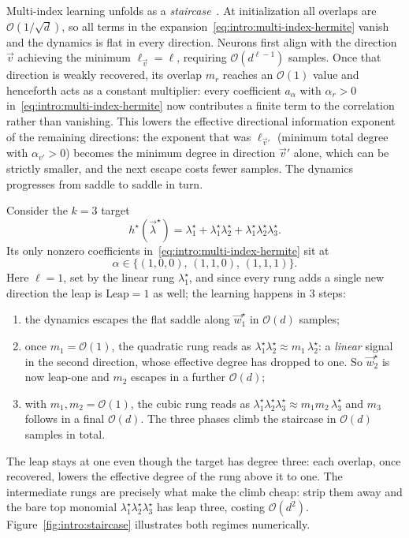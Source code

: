 Multi-index learning unfolds as a \emph{staircase}~\citep{abbe2022merged, abbe2023sgd, dandi2023how}. At initialization all overlaps are \(\mathcal{O}(1/\sqrt{d})\), so all terms in the expansion~\eqref{eq:intro:multi-index-hermite} vanish and the dynamics is flat in every direction. Neurons first align with the direction \(\vec{v}\) achieving the minimum \(\ell_{\vec{v}} = \ell\), requiring \(\mathcal{O}(d^{\ell-1})\) samples. Once that direction is weakly recovered, its overlap \(m_r\) reaches an \(\mathcal{O}(1)\) value and henceforth acts as a constant multiplier: every coefficient \(a_\alpha\) with \(\alpha_r > 0\) in~\eqref{eq:intro:multi-index-hermite} now contributes a finite term to the correlation rather than vanishing. This lowers the effective directional information exponent of the remaining directions: the exponent that was \(\ell_{\vec{v}'}\) (minimum total degree with \(\alpha_{v'} > 0\)) becomes the minimum degree in direction \(\vec{v}'\) alone, which can be strictly smaller, and the next escape costs fewer samples. The dynamics progresses from saddle to saddle in turn.
\begin{example}
    Consider the \(k = 3\) target \[h^\star(\vec{\lambda}^\star) = \lambda^\star_1 + \lambda^\star_1 \lambda^\star_2 + \lambda^\star_1 \lambda^\star_2 \lambda^\star_3.\] Its only nonzero coefficients in~\eqref{eq:intro:multi-index-hermite} sit at \[\alpha \in \{(1,0,0),\,(1,1,0),\,(1,1,1)\}.\] Here \(\ell = 1\), set by the linear rung \(\lambda^\star_1\), and since every rung adds a single new direction the leap is \(\mathrm{Leap} = 1\) as well; the learning happens in 3 steps:
    \begin{enumerate}
        \item the dynamics escapes the flat saddle along \(\vec{w}^\star_1\) in \(\mathcal{O}(d)\) samples;
        \item once \(m_1 = \mathcal{O}(1)\), the quadratic rung reads as \(\lambda^\star_1 \lambda^\star_2 \approx m_1\, \lambda^\star_2\): a \emph{linear} signal in the second direction, whose effective degree has dropped to one. So \(\vec{w}^\star_2\) is now leap-one and \(m_2\) escapes in a further \(\mathcal{O}(d)\);
        \item with \(m_1, m_2 = \mathcal{O}(1)\), the cubic rung reads as \(\lambda^\star_1 \lambda^\star_2 \lambda^\star_3 \approx m_1 m_2\, \lambda^\star_3\) and \(m_3\) follows in a final \(\mathcal{O}(d)\). The three phases climb the staircase in \(\mathcal{O}(d)\) samples in total.
    \end{enumerate}
    The leap stays at one even though the target has degree three: each overlap, once recovered, lowers the effective degree of the rung above it to one. The intermediate rungs are precisely what make the climb cheap: strip them away and the bare top monomial \(\lambda^\star_1 \lambda^\star_2 \lambda^\star_3\) has leap three, costing \(\mathcal{O}(d^2)\).
    Figure~\ref{fig:intro:staircase} illustrates both regimes numerically.
\end{example}

